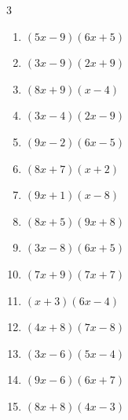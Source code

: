 \begin{multicols}{3}
\begin{enumerate}
  \item $(5x-9)(6x+5)$


  \item $(3x-9)(2x+9)$


  \item $(8x+9)(x-4)$


  \item $(3x-4)(2x-9)$


\columnbreak %

  \item $(9x-2)(6x-5)$


  \item $(8x+7)(x+2)$


  \item $(9x+1)(x-8)$


  \item $(8x+5)(9x+8)$


  \item $(3x-8)(6x+5)$


  \item $(7x+9)(7x+7)$


  \item $(x+3)(6x-4)$


  \item $(4x+8)(7x-8)$


  \item $(3x-6)(5x-4)$


  \item $(9x-6)(6x+7)$


  \item $(8x+8)(4x-3)$


\end{enumerate}
\end{multicols}
